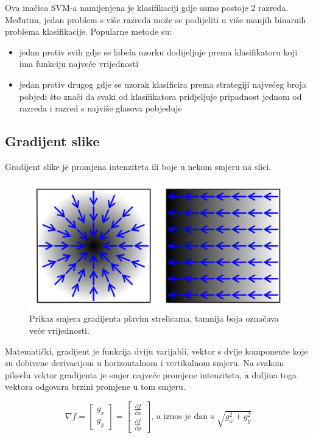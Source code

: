 \documentclass[times, utf8, zavrsni]{fer}
\begin{document}
Ova inačica SVM-a namijenjena je klasifikaciji gdje samo postoje 2 razreda. Međutim, 
jedan problem s više razreda može se podijeliti u više manjih binarnih problema klasifikacije. 
Popularne metode su: 

\begin{itemize}
	\item jedan protiv svih gdje se labela uzorku dodijeljuje prema klasifikatoru koji 
	ima funkciju najveće vrijednosti 
	\item jedan protiv drugog gdje se uzorak klasificira prema strategiji najvećeg 
	broja pobjedi što znači da svaki od klasifikatora pridjeljuje pripadnost jednom od razreda i razred s najviše glasova pobjeđuje
\end{itemize}

\newpage

\subsection{Gradijent slike}

Gradijent slike je promjena intenziteta ili boje u nekom smjeru na slici.

\begin{figure}[htbp]
\centering
\includegraphics[width=0.8\linewidth]{img/Gradient2.png}
\caption{Prikaz smjera gradijenta plavim strelicama, tamnija boja označava veće vrijednosti.}
\end{figure}


Matematički, gradijent je funkcija dviju varijabli, vektor s dvije komponente koje su dobivene
derivacijom u horizontalnom i vertikalnom smjeru. Na svakom pikselu vektor gradijenta je smjer 
najveće promjene intenziteta, a duljina toga vektora odgovara brzini promjene u tom smjeru.

\[
\nabla f = \left[ \begin{array}{c} g_x \\ g_y \end{array}\right]
 = \left[ \begin{array}{c} \frac{\partial f}{\partial x} \\ \frac{\partial f}{\partial y} \end{array}\right]
 \textrm{, a iznos je dan s  } \sqrt{g_x^2 + g_y^2}
\]
\end{document}
